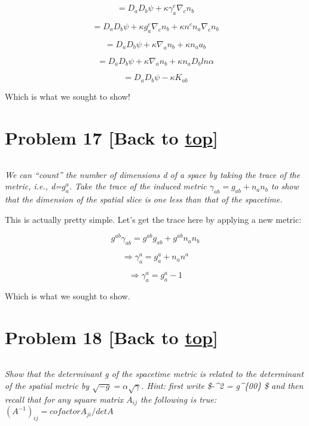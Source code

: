\documentclass[landscape,letterpaper,10pt,english]{article}
\makeatletter
\newcommand{\boxspacing}{\kern\kvtcb@left@rule\kern\kvtcb@boxsep}
\newcommand{\prompt}[4]{
        {\ttfamily\llap{{\color{#2}[#3]:\hspace{3pt}#4}}\vspace{-\baselineskip}}
    }
\makeatother
\begin{document}
\[ = D_a D_b \psi + \kappa \gamma^c_a \nabla_c n_b \]

\[ = D_a D_b \psi + \kappa g^c_a \nabla_c n_b  + \kappa n^c n_a \nabla_c n_b\]

\[ = D_a D_b \psi + \kappa \nabla_a n_b  + \kappa n_a a_b\]

\[ = D_a D_b \psi + \kappa \nabla_a n_b  + \kappa n_a D_b ln\alpha\]

\[ = D_a D_b \psi - \kappa K_{ab}\]

Which is what we sought to show!

    \hypertarget{problem-17-back-to-top}{%
\section{\texorpdfstring{Problem 17 {[}Back to
\hyperref[toc]{top}{]}}{Problem 17 {[}Back to {]}}}\label{problem-17-back-to-top}}

\[\label{P17}\]

\emph{We can ``count'' the number of dimensions d of a space by taking
the trace of the metric, i.e., d=\(g^a_a\). Take the trace of the
induced metric \(\gamma_{ab} = g_{ab} + n_a n_b\) to show that the
dimension of the spatial slice is one less than that of the spacetime.}

This is actually pretty simple. Let's get the trace here by applying a
new metric:

\[g^{ab}\gamma_{ab} = g^{ab}g_{ab} + g^{ab}n_a n_b\]

\[ \Rightarrow \gamma^a_a= g^a_a + n_a n^a\]

\[ \Rightarrow \gamma^a_a= g^a_a -1\]

Which is what we sought to show.

    \hypertarget{problem-18-back-to-top}{%
\section{\texorpdfstring{Problem 18 {[}Back to
\hyperref[toc]{top}{]}}{Problem 18 {[}Back to {]}}}\label{problem-18-back-to-top}}

\[\label{P18}\]

\emph{Show that the determinant g of the spacetime metric is related to
the determinant of the spatial metric by
\(\sqrt{-g} = \alpha \sqrt{\gamma}\). Hint: first write \$-\alpha\^{}2 =
g\^{}\{00\} \$ and then recall that for any square matrix \(A_{ij}\) the
following is true: \((A^{-1})_{ij} = cofactorA_{ji}/detA\)}

    \begin{tcolorbox}[breakable, size=fbox, boxrule=1pt, pad at break*=1mm,colback=cellbackground, colframe=cellborder]
\prompt{In}{incolor}{ }{\boxspacing}
\begin{Verbatim}[commandchars=\\\{\}]

\end{Verbatim}
\end{tcolorbox}
\end{document}
